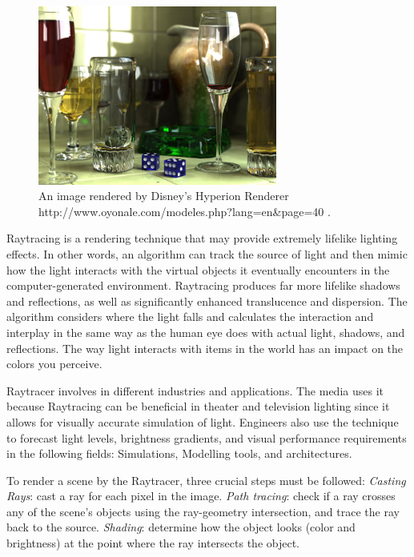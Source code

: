 \documentclass[11pt,a4paper]{article}
\begin{document}
		\begin{figure}[H] 
		\centering
		\includegraphics[width=0.7\textwidth]{1.jpg}
		\caption{\centering An image rendered by Disney's Hyperion Renderer http://www.oyonale.com/modeles.php?lang=en&page=40 \protect\cite{burley2018design}.}
	\end{figure}
	\noindent
	
	
	Raytracing is a rendering technique that may provide extremely lifelike lighting effects. In other words, an algorithm can track the source of light and then mimic how the light interacts with the virtual objects it eventually encounters in the computer-generated environment. Raytracing produces far more lifelike shadows and reflections, as well as significantly enhanced translucence and dispersion. The algorithm considers where the light falls and calculates the interaction and interplay in the same way as the human eye does with actual light, shadows, and reflections. The way light interacts with items in the world has an impact on the colors you perceive.
	
	\vspace*{5px}
	Raytracer involves in different industries and applications. The media uses it because Raytracing can be beneficial in theater and television lighting since it allows for visually accurate simulation of light. Engineers also use the technique to forecast light levels, brightness gradients, and visual performance requirements in the following fields: Simulations, Modelling tools, and architectures. 
	
	\vspace*{5px}
	To render a scene by the Raytracer, three crucial steps must be followed: 
	\textit{Casting Rays}: cast a ray for each pixel in the image.
	\textit{Path tracing}: check if a ray crosses any of the scene's objects using the ray-geometry intersection, and trace the ray back to the source.
	\textit{Shading}: determine how the object looks (color and brightness) at the point where the ray intersects the object.
	
\end{document}
